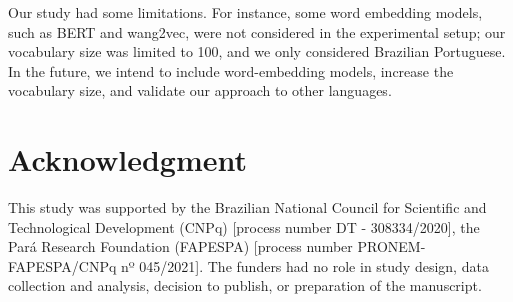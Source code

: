 \documentclass[conference]{IEEEtran}
\begin{document}
Our study had some limitations. For instance, some word embedding models, such as BERT and wang2vec, were not considered in the experimental setup; our vocabulary size was limited to 100, and we only considered Brazilian Portuguese. In the future, we intend to include word-embedding models, increase the vocabulary size, and validate our approach to other languages.





\balance
\section*{Acknowledgment}
This study was supported by the Brazilian National Council for Scientific and Technological Development (CNPq) [process number  DT - 308334/2020], the Pará Research Foundation (FAPESPA) [process number PRONEM-FAPESPA/CNPq nº 045/2021]. The funders had no role in study design, data collection and analysis, decision to publish, or preparation of the manuscript. 

\end{document}
